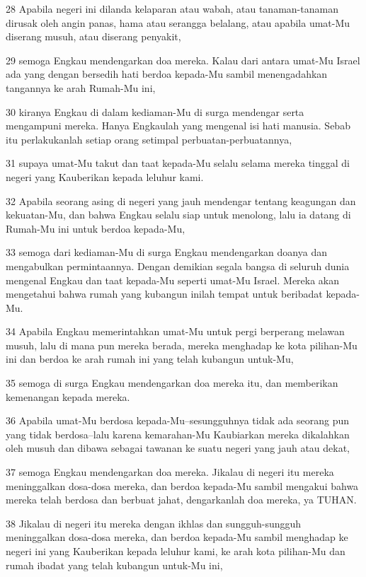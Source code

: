 \par 28 Apabila negeri ini dilanda kelaparan atau wabah, atau tanaman-tanaman dirusak oleh angin panas, hama atau serangga belalang, atau apabila umat-Mu diserang musuh, atau diserang penyakit,
\par 29 semoga Engkau mendengarkan doa mereka. Kalau dari antara umat-Mu Israel ada yang dengan bersedih hati berdoa kepada-Mu sambil menengadahkan tangannya ke arah Rumah-Mu ini,
\par 30 kiranya Engkau di dalam kediaman-Mu di surga mendengar serta mengampuni mereka. Hanya Engkaulah yang mengenal isi hati manusia. Sebab itu perlakukanlah setiap orang setimpal perbuatan-perbuatannya,
\par 31 supaya umat-Mu takut dan taat kepada-Mu selalu selama mereka tinggal di negeri yang Kauberikan kepada leluhur kami.
\par 32 Apabila seorang asing di negeri yang jauh mendengar tentang keagungan dan kekuatan-Mu, dan bahwa Engkau selalu siap untuk menolong, lalu ia datang di Rumah-Mu ini untuk berdoa kepada-Mu,
\par 33 semoga dari kediaman-Mu di surga Engkau mendengarkan doanya dan mengabulkan permintaannya. Dengan demikian segala bangsa di seluruh dunia mengenal Engkau dan taat kepada-Mu seperti umat-Mu Israel. Mereka akan mengetahui bahwa rumah yang kubangun inilah tempat untuk beribadat kepada-Mu.
\par 34 Apabila Engkau memerintahkan umat-Mu untuk pergi berperang melawan musuh, lalu di mana pun mereka berada, mereka menghadap ke kota pilihan-Mu ini dan berdoa ke arah rumah ini yang telah kubangun untuk-Mu,
\par 35 semoga di surga Engkau mendengarkan doa mereka itu, dan memberikan kemenangan kepada mereka.
\par 36 Apabila umat-Mu berdosa kepada-Mu--sesungguhnya tidak ada seorang pun yang tidak berdosa--lalu karena kemarahan-Mu Kaubiarkan mereka dikalahkan oleh musuh dan dibawa sebagai tawanan ke suatu negeri yang jauh atau dekat,
\par 37 semoga Engkau mendengarkan doa mereka. Jikalau di negeri itu mereka meninggalkan dosa-dosa mereka, dan berdoa kepada-Mu sambil mengakui bahwa mereka telah berdosa dan berbuat jahat, dengarkanlah doa mereka, ya TUHAN.
\par 38 Jikalau di negeri itu mereka dengan ikhlas dan sungguh-sungguh meninggalkan dosa-dosa mereka, dan berdoa kepada-Mu sambil menghadap ke negeri ini yang Kauberikan kepada leluhur kami, ke arah kota pilihan-Mu dan rumah ibadat yang telah kubangun untuk-Mu ini,
